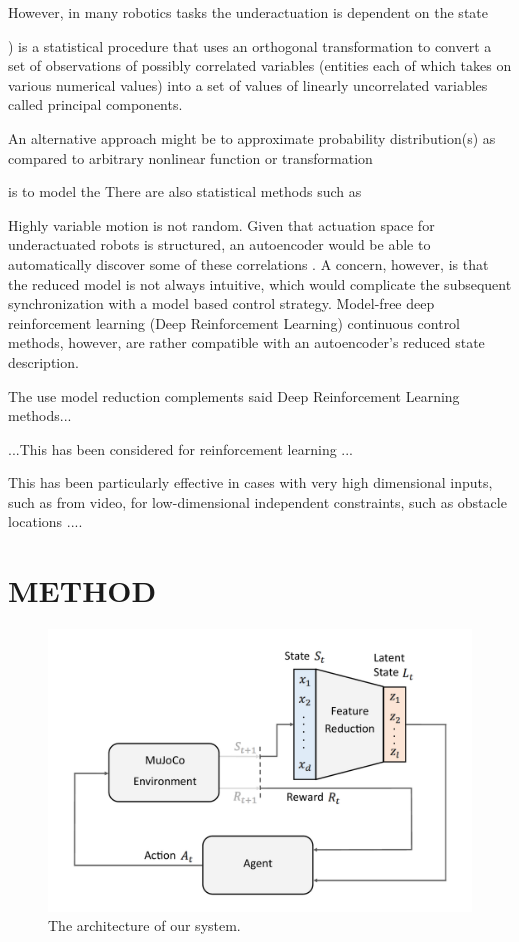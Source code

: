 \documentclass[letterpaper, 10 pt, conference]{ieeeconf}
\begin{document}
  However, in many robotics tasks the underactuation is dependent on the state  


) is a statistical procedure that uses an orthogonal transformation to convert a set of observations of possibly correlated variables (entities each of which takes on various numerical values) into a set of values of linearly uncorrelated variables called principal components.


An alternative approach might be to approximate  probability distribution(s) as compared to arbitrary nonlinear function or transformation

is to model the There are also statistical methods such as 











Highly variable motion is not random.
Given that actuation space for underactuated robots is structured, an autoencoder would be able to automatically discover some of these correlations \cite{AE_hinton2006reducing, ngsparse}.
A concern, however, is that the reduced model is not always intuitive, which would complicate the subsequent synchronization with a model based control strategy.
Model-free deep reinforcement learning (Deep Reinforcement Learning) continuous control methods, however, are rather compatible with an autoencoder's reduced state description.

The use model reduction complements said Deep Reinforcement Learning methods...

...This has been considered for reinforcement learning ... 

This has been particularly effective in cases with very high dimensional inputs, such as from video, for low-dimensional independent constraints, such as obstacle locations \cite{finn2016deep, lynch2019learning}....

\section{METHOD}

\begin{figure}[t]
    \centering
    \includegraphics[width=\linewidth]{fig-system-arch}
    \caption{
        The architecture of our system.
    }
    \label{fig:system-arch}
\end{figure}
\end{document}

